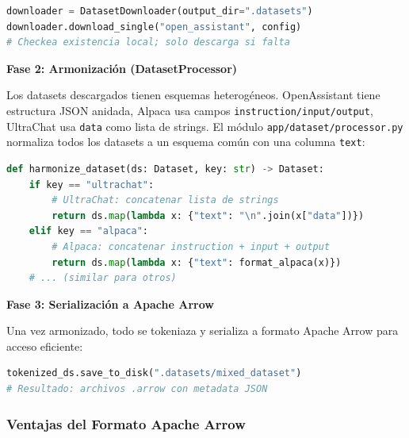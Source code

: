 \begin{lstlisting}[language=python, caption={Descarga idempotente de datasets}]
downloader = DatasetDownloader(output_dir=".datasets")
downloader.download_single("open_assistant", config)
# Checkea existencia local; solo descarga si falta
\end{lstlisting}

\textbf{Fase 2: Armonización (DatasetProcessor)}

Los datasets descargados tienen esquemas heterogéneos. OpenAssistant tiene estructura JSON anidada, Alpaca usa campos \texttt{instruction/input/output}, UltraChat usa \texttt{data} como lista de strings. El módulo \texttt{app/dataset/processor.py} normaliza todos los datasets a un esquema común con una columna \texttt{text}:

\begin{lstlisting}[language=python, caption={Armonización de esquemas heterogéneos}]
def harmonize_dataset(ds: Dataset, key: str) -> Dataset:
    if key == "ultrachat":
        # UltraChat: concatenar lista de strings
        return ds.map(lambda x: {"text": "\n".join(x["data"])})
    elif key == "alpaca":
        # Alpaca: concatenar instruction + input + output
        return ds.map(lambda x: {"text": format_alpaca(x)})
    # ... (similar para otros)
\end{lstlisting}

\textbf{Fase 3: Serialización a Apache Arrow}

Una vez armonizado, todo se tokeniaza y serializa a formato Apache Arrow para acceso eficiente:

\begin{lstlisting}[language=python, caption={Serialización a Arrow con tokenización}]
tokenized_ds.save_to_disk(".datasets/mixed_dataset")
# Resultado: archivos .arrow con metadata JSON
\end{lstlisting}

\subsubsection{Ventajas del Formato Apache Arrow}

